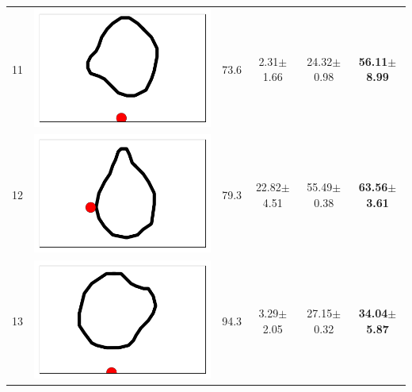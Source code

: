 \begin{table}[t]
{\begin{tabular}{llcccc}
11 &   \includegraphics[height= \shapesize cm]{tps-experiments/shapes/pts_9.png} &        73.6 &            2.31$\pm$1.66 &           24.32$\pm$0.98 &  \textbf{56.11$\pm$8.99} \\
12 &  \includegraphics[height= \shapesize cm]{tps-experiments/shapes/pts_10.png} &        79.3 &           22.82$\pm$4.51 &           55.49$\pm$0.38 &  \textbf{63.56$\pm$3.61} \\
13 &   \includegraphics[height= \shapesize cm]{tps-experiments/shapes/pts_8.png} &        94.3 &            3.29$\pm$2.05 &           27.15$\pm$0.32 &  \textbf{34.04$\pm$5.87} \\

\end{tabular}}
\end{table}
